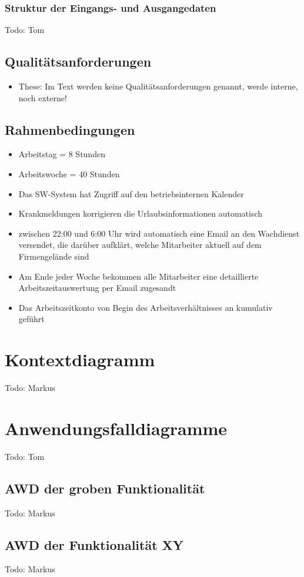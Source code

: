 \subsection{Struktur der Eingangs- und Ausgangedaten}
Todo: Tom
\section{Qualit\"atsanforderungen}
\begin{itemize}
\item \Large
These: Im Text werden keine Qualit\"atsanforderungen genannt, werde interne, noch externe! 
\end{itemize}
\newpage
\section{Rahmenbedingungen}

\begin{itemize}
	\item Arbeitstag  =  8 Stunden
	\item Arbeitswoche = 40 Stunden
	\item Das SW-System hat Zugriff auf den betriebsinternen Kalender
	\item Krankmeldungen korrigieren die Urlaubsinformationen automatisch
	\item zwischen 22:00 und 6:00 Uhr wird automatisch eine Email an den Wachdienst versendet, die dar\"uber aufkl\"art, welche Mitarbeiter aktuell auf dem Firmengel\"ande sind
	\item Am Ende jeder Woche bekommen alle Mitarbeiter eine detaillierte Arbeitszeitauswertung per Email zugesandt
	\item Das Arbeitszeitkonto von Begin des Arbeitsverh\"altnisses an kumulativ gef\"uhrt 
\end{itemize}


\chapter{Kontextdiagramm}
Todo: Markus
\chapter{Anwendungsfalldiagramme}
Todo: Tom
\section{AWD der groben Funktionalität}
Todo: Markus
\section{AWD der Funktionalität XY}
Todo: Markus
